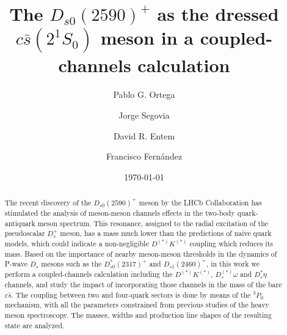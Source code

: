 \documentclass[aps, prd, floatfix, twocolumn, superscriptaddress, nofootinbib]{revtex4-1}
\begin{document}

\title{The $D_{s0}(2590)^+$ as the dressed $c\bar s(2^1S_0)$ meson in a coupled-channels calculation}

\author{Pablo G. Ortega}

\author{Jorge Segovia}

\author{David R. Entem}

\author{Francisco Fern\'andez}

\date{\today}

\begin{abstract}
The recent discovery of the $D_{s0}(2590)^+$ meson by the LHCb Collaboration
has stimulated the analysis of meson-meson channels effects in the two-body quark-antiquark meson spectrum.
This resonance, assigned to the radial excitation of the pseudoscalar $D_s^+$ meson,
has a mass much lower than the predictions of naive quark models, which could indicate
a non-negligible $D^{(*)}K^{(*)}$ coupling which reduces its mass.
Based on the importance of nearby meson-meson thresholds in the dynamics of P-wave $D_s$ mesons such as the $D_{s0}^*(2317)^+$ and $D_{s1}(2460)^+$,
in this work we perform a coupled-channels calculation including the $D^{(*)}K^{(*)}$, $D_s^{(*)}\omega$ and $D_s^*\eta$ channels, and study the impact of incorporating those channels
in the mass of the bare $c\bar s$. The coupling between two and four-quark sectors is
done by means of the $^3P_0$ mechanism, with all the parameters constrained from previous studies of the heavy meson spectroscopy.
The masses, widths and production line shapes of the resulting state are analyzed.

\end{abstract}
\end{document}
